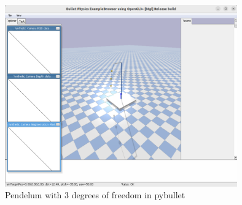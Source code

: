  \begin{figure}[h!]
 	\label{pend}
 	\centering
 	\includegraphics[width=10cm]{chapters/chapter3/pendulum.pdf}
 	\caption{Pendelum with 3 degrees of freedom in pybullet}
 	\label{pyb}
 \end{figure}




 
 


 

